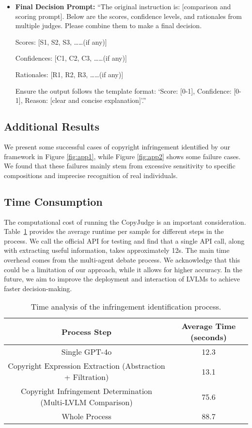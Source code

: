 \begin{itemize}
    \item \textbf{Final Decision Prompt:}  
    ``The original instruction is: [comparison and scoring prompt]. Below are the scores, confidence levels, and rationales from multiple judges. Please combine them to make a final decision.  
    
    Scores: [S1, S2, S3, ……(if any)]
    
    Confidences: [C1, C2, C3, ……(if any)] 
    
    Rationales: [R1, R2, R3, ……(if any)]  
    
    Ensure the output follows the template format: `Score: [0-1], Confidence: [0-1], Reason: [clear and concise explanation]'.''


\end{itemize}


\subsection{Additional Results}
\label{resultsA}
We present some successful cases of copyright infringement identified by our framework in Figure \ref{fig:app1}, while Figure \ref{fig:app2} shows some failure cases. We found that these failures mainly stem from excessive sensitivity to specific compositions and imprecise recognition of real individuals.




\subsection{Time Consumption}
\label{timeA}
The computational cost of running the CopyJudge is an important consideration. Table~\ref{tab:time} provides the average runtime per sample for different steps in the process. We call the official API for testing and find that a single API call, along with extracting useful information, takes approximately 12s. The main time overhead comes from the multi-agent debate process. We acknowledge that this could be a limitation of our approach, while it allows for higher accuracy. In the future, we aim to improve the deployment and interaction of LVLMs to achieve faster decision-making.

\begin{table}[h]
    \centering
    \begin{footnotesize}
    \begin{tabular}{c|c}
        \hline
        Process Step & Average Time (seconds) \\
        \hline
        Single GPT-4o  & 12.3 \\
        Copyright Expression Extraction (Abstraction + Filtration)  & 13.1 \\
        Copyright Infringement Determination (Multi-LVLM Comparison) & 75.6 \\
        Whole Process & 88.7 \\
        \hline
    \end{tabular}
    \caption{Time analysis of the infringement identification process.}
    \label{tab:time}
    \end{footnotesize}
\end{table}


